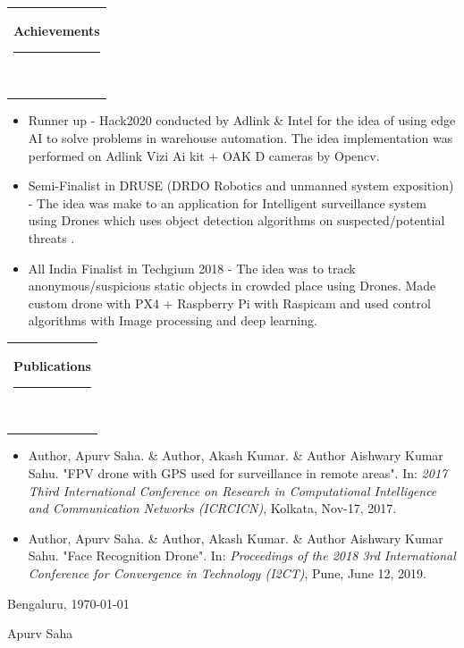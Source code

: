 \documentclass[10pt,A4,english]{article}
\newcommand{\mpwidth}{\linewidth-\fboxsep-\fboxsep}
\newcommand{\cvtext}[1] {
	\begin{tabular*}{1\mpwidth}{p{0.98\mpwidth}}
		\parbox{1\mpwidth}{#1}
	\end{tabular*}
}
\newcommand{\cvsection}[1] {
	\vspace{14pt}
	\cvtext{
		\textbf{\LARGE{\textcolor{darkcol}{#1}}}\\[-4pt]
		\textcolor{accentcol}{ \rule{0.2\textwidth}{1.5pt} } \\
	}
}
\begin{document}
\begin{paracol}{2}
\begin{rightcolumn}
\cvsection{Achievements}

\begin{itemize}[leftmargin=*]
\item Runner up - Hack2020 conducted by Adlink \& Intel for the idea of using edge AI to solve problems in warehouse automation. The idea implementation was performed on Adlink Vizi Ai kit + OAK D cameras by Opencv.
\item Semi-Finalist in DRUSE (DRDO Robotics and unmanned system exposition) - The idea was make to an application for Intelligent surveillance system using Drones which uses object detection algorithms on suspected/potential threats .
\item All India Finalist in Techgium 2018 - The idea was to track anonymous/suspicious static objects in crowded place using Drones. Made custom drone with PX4 + Raspberry Pi with Raspicam and used control algorithms with Image processing and deep learning.
\end{itemize}


\cvsection{Publications}

\begin{itemize}[leftmargin=*]
\item Author, Apurv Saha. \& Author, Akash Kumar. \&  Author Aishwary Kumar Sahu.  "FPV drone with GPS used for surveillance in remote areas". In: \textit{2017 Third International Conference on Research in Computational Intelligence and Communication Networks (ICRCICN)}, Kolkata, Nov-17, 2017.
\item Author, Apurv Saha. \& Author, Akash Kumar. \&  Author Aishwary Kumar Sahu. "Face Recognition Drone". In: \textit{Proceedings of the 2018 3rd International Conference for Convergence in Technology (I2CT)}, Pune, June 12, 2019.
\end{itemize}
\mbox{}
\vfill
\mbox{}
\vfill
\mbox{}
\vfill
\mbox{}
\vfill
\mbox{}
\vfill
\mbox{}
\vfill
\mbox{}


Bengaluru, \today     \hspace{1cm}   \hrulefill

\hspace*{30mm}\phantom{Bengaluru, \today }Apurv Saha

\end{rightcolumn}
\end{paracol}
\end{document}
